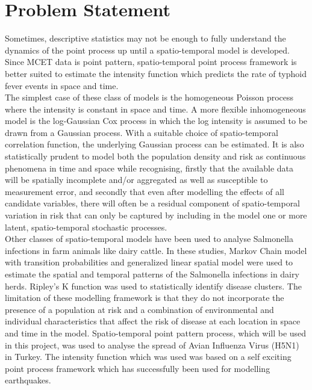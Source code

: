 \documentclass[12pt,a4paper]{report}
\begin{document}
\section{Problem Statement}

Sometimes, descriptive statistics may not be enough to fully understand the dynamics of the point process up until a spatio-temporal model is developed. Since MCET data is point pattern, spatio-temporal point process framework is better suited to estimate the intensity function which predicts the rate of typhoid fever events in space and time.\\

The simplest case of these class of models is the homogeneous Poisson process where the intensity is constant in space and time. A more 
flexible inhomogeneous model is the log-Gaussian Cox process in which the log intensity is assumed to be drawn from a Gaussian process.\cite{Diggle2014} With a suitable choice of spatio-temporal correlation function, the underlying
Gaussian process can be estimated. It is also statistically prudent to model both the population density and risk as continuous phenomena in time and space while recognising, firstly that the available data will be spatially incomplete and/or aggregated as well as susceptible to measurement error, and
secondly that even after modelling the effects of all candidate variables, there will often be a
residual component of spatio-temporal variation in risk that can only be captured by including
in the model one or more latent, spatio-temporal stochastic processes.\\

Other classes of spatio-temporal models have been used to analyse Salmonella infections in farm animals like dairy cattle. \cite{Fenton} \cite{Cox} In these studies, Markov Chain model with transition probabilities and generalized linear spatial model were used to estimate the spatial and temporal patterns of the Salmonella infections in dairy herds. Ripley’s K function was used to statistically identify disease clusters. The limitation of these modelling framework is that they do not incorporate the presence of a population at risk and a combination of environmental and individual characteristics that affect the risk of disease at each location in space and time in the model. Spatio-temporal point pattern process, which will be used in this project, was used to analyse the spread of Avian Influenza Virus (H5N1) in Turkey. The intensity function which was used was based on a self exciting point process framework which has successfully been used for modelling earthquakes.\cite{Kim} \cite{Ogata} \\ 
\end{document}
